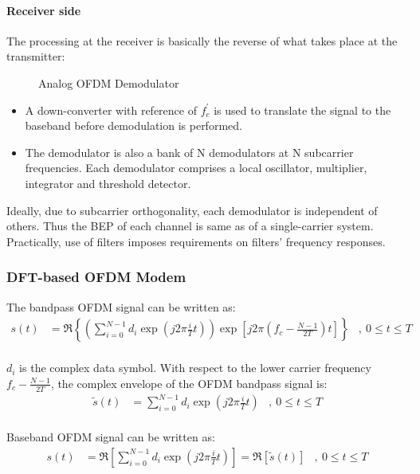 \paragraph{Receiver side}
The processing at the receiver is basically the reverse of what takes place at the transmitter\cite{ofdm_intro}:
\begin{figure}[h!]
	\centerline{\resizebox{16cm}{!}{}}
	\caption{Analog OFDM Demodulator}
	\label{fig:anal_demod}
\end{figure}
\begin{itemize}
	\item A down-converter with reference of $f_c^\prime$ is used to translate the signal to the baseband before demodulation is performed.
	\item The demodulator is also a bank of N demodulators at N subcarrier frequencies. Each demodulator comprises a local oscillator, multiplier, integrator and threshold detector.
\end{itemize}
Ideally, due to subcarrier \gls{orthogonal}ity, each demodulator is independent of others. Thus the BEP of each channel is same as of a single-carrier system. Practically, use of filters imposes requirements on filters' frequency responses.

\subsubsection{\gls{DFT}-based OFDM Modem}
The bandpass OFDM signal can be written as:
\begin{align*}
s(t) &= \Re\left\{ \left( \sum_{i=0}^{N-1}d_i\exp(j2\pi \frac{i}{T}t)\right)\exp\left[ j2\pi\left( f_c-\frac{N-1}{2T}\right)t\right]\right\}&,\ 0\leq t\leq T\\
\end{align*}

$d_i$ is the complex data symbol. With respect to the lower carrier frequency $f_c - \frac{N-1}{2T}$, the complex envelope of the OFDM bandpass signal is:
\begin{align*}
\tilde{s}(t) &= \sum_{i=0}^{N-1}d_i\exp(j2\pi\frac{i}{T}t)&,\ 0\leq t\leq T\\
\end{align*}

Baseband OFDM signal can be written as:
\begin{align*}
s(t) &= \Re\left[ \sum_{i=0}^{N-1}d_i\exp(j2\pi\frac{i}{T}t)\right] = \Re\left[ \tilde{s}(t)\right]&,\ 0\leq t\leq T\\
\end{align*}

